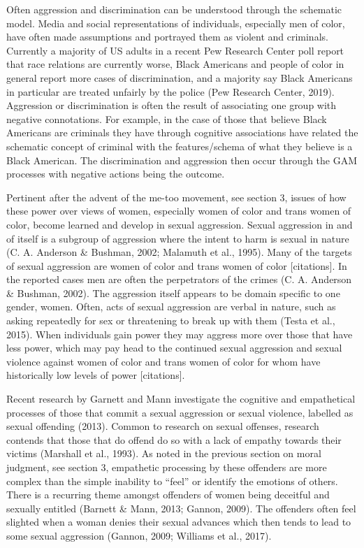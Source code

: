 \documentclass[
  donotrepeattitle,doc, 12pt, a4paper,floatsintext]{apa7}
\begin{document}
Often aggression and discrimination can be understood through the schematic model. Media and social representations of individuals, especially men of color, have often made assumptions and portrayed them as violent and criminals. Currently a majority of US adults in a recent Pew Research Center poll report that race relations are currently worse, Black Americans and people of color in general report more cases of discrimination, and a majority say Black Americans in particular are treated unfairly by the police (Pew Research Center, 2019). Aggression or discrimination is often the result of associating one group with negative connotations. For example, in the case of those that believe Black Americans are criminals they have through cognitive associations have related the schematic concept of criminal with the features/schema of what they believe is a Black American. The discrimination and aggression then occur through the GAM processes with negative actions being the outcome.

Pertinent after the advent of the me-too movement, see section 3, issues of how these power over views of women, especially women of color and trans women of color, become learned and develop in sexual aggression. Sexual aggression in and of itself is a subgroup of aggression where the intent to harm is sexual in nature (C. A. Anderson \& Bushman, 2002; Malamuth et al., 1995). Many of the targets of sexual aggression are women of color and trans women of color {[}citations{]}. In the reported cases men are often the perpetrators of the crimes (C. A. Anderson \& Bushman, 2002). The aggression itself appears to be domain specific to one gender, women. Often, acts of sexual aggression are verbal in nature, such as asking repeatedly for sex or threatening to break up with them (Testa et al., 2015). When individuals gain power they may aggress more over those that have less power, which may pay head to the continued sexual aggression and sexual violence against women of color and trans women of color for whom have historically low levels of power {[}citations{]}.

Recent research by Garnett and Mann investigate the cognitive and empathetical processes of those that commit a sexual aggression or sexual violence, labelled as sexual offending (2013). Common to research on sexual offenses, research contends that those that do offend do so with a lack of empathy towards their victims (Marshall et al., 1993). As noted in the previous section on moral judgment, see section 3, empathetic processing by these offenders are more complex than the simple inability to ``feel'' or identify the emotions of others. There is a recurring theme amongst offenders of women being deceitful and sexually entitled (Barnett \& Mann, 2013; Gannon, 2009). The offenders often feel slighted when a woman denies their sexual advances which then tends to lead to some sexual aggression (Gannon, 2009; Williams et al., 2017).
\end{document}
